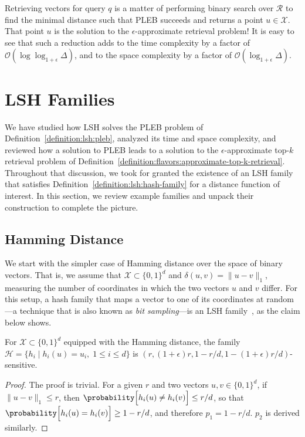 Retrieving vectors for query $q$ is a matter of performing
binary search over $\mathcal{R}$ to find the minimal
distance such that PLEB succeeds and returns a point $u \in \mathcal{X}$.
That point $u$ is the solution to the $\epsilon$-approximate retrieval
problem! It is easy to see that such a reduction adds to the time complexity
by a factor of $\mathcal{O}(\log \log_{1+\epsilon} \Delta)$, and to the space
complexity by a factor of $\mathcal{O}(\log_{1+\epsilon} \Delta)$.

\section{LSH Families}
We have studied how LSH solves the PLEB problem of Definition~\ref{definition:lsh:pleb},
analyzed its time and space complexity, and reviewed how a solution to PLEB leads
to a solution to the $\epsilon$-approximate top-$k$ retrieval problem of Definition~\ref{definition:flavors:approximate-top-k-retrieval}.
Throughout that discussion, we took for granted the existence of an LSH family
that satisfies Definition~\ref{definition:lsh:hash-family} for a distance function
of interest. In this section, we review example families and unpack their construction
to complete the picture.

\subsection{Hamming Distance}
We start with the simpler case of Hamming distance over the space of binary vectors.
That is, we assume that $\mathcal{X} \subset \{0, 1\}^d$ and $\delta(u, v) = \lVert u - v \rVert_1$,
measuring the number of coordinates in which the two vectors $u$ and $v$ differ.
For this setup, a hash family that maps a vector to one of its coordinates at
random---a technique that is also known as \emph{bit sampling}---is an LSH family~\citep{lsh},
as the claim below shows.

\begin{theorem}
For $\mathcal{X} \subset \{ 0, 1 \}^d$ equipped with the Hamming distance,
the family $\mathcal{H} = \{ h_i \;|\; h_i(u) = u_i, \; 1 \leq i \leq d \}$
is $(r, (1 + \epsilon)r, 1 - r/d, 1 - (1+\epsilon)r/d)$-sensitive.
\end{theorem}
\begin{proof}
    The proof is trivial. For a given $r$ and two vectors $u, v \in \{ 0, 1\}^d$,
    if $\lVert u - v \rVert_1 \leq r$, then $\probability\Big[ h_i(u) \neq h_i(v) \Big] \leq r/d$,
    so that $\probability\Big[ h_i(u) = h_i(v) \Big] \geq 1 - r/d$, and therefore $p_1 = 1 - r/d$.
    $p_2$ is derived similarly.
\end{proof}

